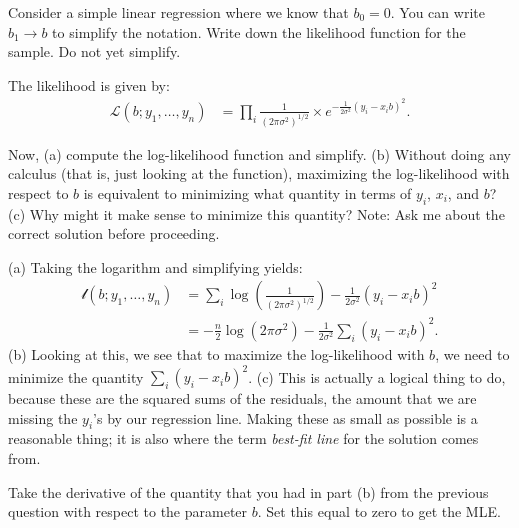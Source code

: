 
Consider a simple linear regression where we know that $b_0 = 0$. You can write
$b_1 \rightarrow b$ to simplify the notation. Write down the likelihood function
for the sample. Do not yet simplify.


The likelihood is given by:
\begin{align*}
\mathcal{L}(b; y_1, \ldots, y_n) &= 
\prod_i \frac{1}{(2 \pi \sigma^2)^{1/2}} \times e^{-\frac{1}{2\sigma^2}(y_i - x_i b)^2}.
\end{align*}



Now, (a) compute the log-likelihood function and simplify. (b) Without doing any
calculus (that is, just looking at the function), maximizing the log-likelihood
with respect to $b$ is equivalent to minimizing what quantity in terms of $y_i$,
$x_i$, and $b$? (c) Why might it make sense to minimize this quantity?
Note: Ask me about the correct solution before proceeding. 


(a) Taking the logarithm and simplifying yields:
\begin{align*}
\mathcal{l}(b; y_1, \ldots, y_n) &= 
\sum_i \log\left(\frac{1}{(2 \pi \sigma^2)^{1/2}}\right) - \frac{1}{2\sigma^2}(y_i - x_i b)^2 \\
&=  -\frac{n}{2}\log(2 \pi \sigma^2) - \frac{1}{2\sigma^2} \sum_i (y_i - x_i b)^2.
\end{align*}
(b) Looking at this, we see that to maximize the log-likelihood with $b$, we need
to minimize the quantity $\sum_i (y_i - x_i b)^2$. (c) This is actually a logical
thing to do, because these are the squared sums of the residuals, the amount that
we are missing the $y_i$'s by our regression line. Making these as small as 
possible is a reasonable thing; it is also where the term \textit{best-fit line}
for the solution comes from.


Take the derivative of the quantity that you had in part (b) from the previous
question with respect to the parameter $b$. Set this equal to zero to get the 
MLE.


